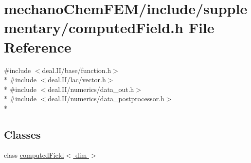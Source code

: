 \section{mechano\-Chem\-F\-E\-M/include/supplementary/computed\-Field.h File Reference}
\label{computed_field_8h}
{\ttfamily \#include $<$deal.\-I\-I/base/function.\-h$>$}\\*
{\ttfamily \#include $<$deal.\-I\-I/lac/vector.\-h$>$}\\*
{\ttfamily \#include $<$deal.\-I\-I/numerics/data\-\_\-out.\-h$>$}\\*
{\ttfamily \#include $<$deal.\-I\-I/numerics/data\-\_\-postprocessor.\-h$>$}\\*
\subsection*{Classes}
\begin{DoxyCompactItemize}
\item 
class \hyperlink{classcomputed_field}{computed\-Field$<$ dim $>$}
\end{DoxyCompactItemize}
